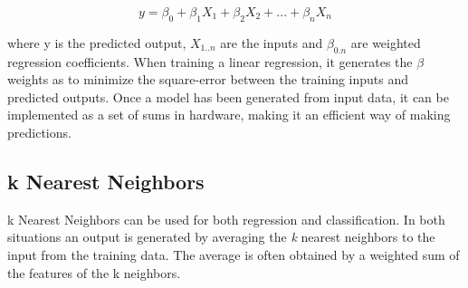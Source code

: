 \begin{equation}
y = \beta_0 + \beta_1X_1 + \beta_2X_2 + ... + \beta_nX_n
\end{equation}

where y is the predicted output, $X_{1..n}$ are the inputs and $\beta_{0.n}$ are weighted regression coefficients.
When training a linear regression, it generates the $\beta$ weights as to minimize the square-error between the training inputs and predicted outputs.
Once a model has been generated from input data, it can be implemented as a set of sums in hardware, making it an efficient way of making predictions.

\subsection{k Nearest Neighbors}

k Nearest Neighbors can be used for both regression and classification.
In both situations an output is generated by averaging the \textit{k} nearest neighbors to the input from the training data.
The average is often obtained by a weighted sum of the features of the k neighbors.